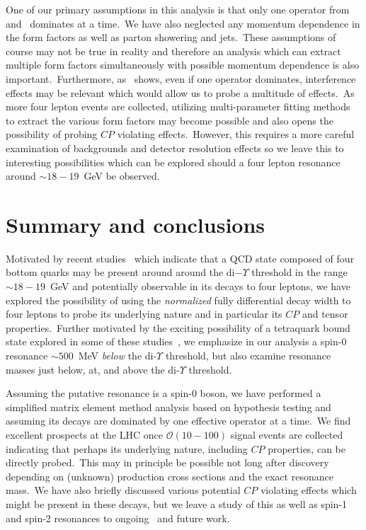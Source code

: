 \documentclass[nofootinbib,twocolumn,prl,preprintnumbers]{revtex4-1}
\begin{document}
One of our primary assumptions in this analysis is that only one operator from~ and~ dominates at a time.~We have also neglected any momentum dependence in the form factors as well as parton showering and jets.~These assumptions of course may not be true in reality and therefore an analysis which can extract multiple form factors simultaneously with possible momentum dependence is also important.~Furthermore, as~ shows, even if one operator dominates, interference effects may be relevant which would allow us to probe a multitude of effects.~As more four lepton events are collected, utilizing multi-parameter fitting methods~\cite{Chen:2013ejz,Chen:2014pia} to extract the various form factors may become possible and also opens the possibility of probing $CP$ violating effects.~However, this requires a more careful examination of backgrounds and detector resolution effects so we leave this to interesting possibilities which can be explored should a four lepton resonance around $\sim 18 - 19$~GeV be observed. 


\section{Summary and conclusions} \label{sec:const}

Motivated by recent studies~\cite{Berezhnoy:2011xn,Du:2012wp,Chen:2015moa,Karliner:2016zzc,Chen:2016jxd,Bai:2016int,Wu:2016vtq,Richard:2017vry,Wang:2017jtz,Eichten:2017ual} which indicate that a QCD state composed of four bottom quarks may be present around around the di$-\Upsilon$ threshold in the range $\sim 18 - 19$~GeV and potentially observable in its decays to four leptons, we have explored the possibility of using the \emph{normalized} fully differential decay width to four leptons to probe its underlying nature and in particular its $CP$ and tensor properties.~Further motivated by the exciting possibility of a tetraquark bound state explored in some of these studies~\cite{Berezhnoy:2011xn,Du:2012wp,Chen:2015moa,Karliner:2016zzc,Chen:2016jxd,Bai:2016int,Wu:2016vtq,Richard:2017vry,Wang:2017jtz}, we emphasize in our analysis a spin-0 resonance $\sim 500$~MeV \emph{below} the di-$\Upsilon$ threshold, but also examine  resonance masses just below, at, and above the di-$\Upsilon$ threshold.

Assuming the putative resonance is a spin-0 boson, we have performed a simplified matrix element method analysis based on hypothesis testing and assuming its decays are dominated by one effective operator at a time.~We find excellent prospects at the LHC once $\mathcal{O}(10-100)$ signal events are collected indicating that perhaps its underlying nature, including $CP$ properties, can be directly probed.~This may in principle be possible not long after discovery depending on (unknown) production cross sections and the exact resonance mass.~We have also briefly discussed various potential $CP$ violating effects which might be present in these decays, but we leave a study of this as well as spin-1 and spin-2 resonances to ongoing~\cite{followup2} and future work.
\end{document}
